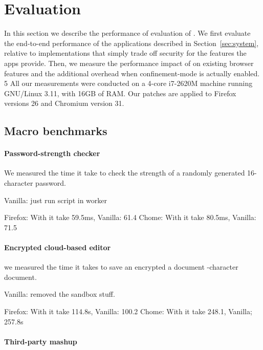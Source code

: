 \section{Evaluation}
\label{sec:eval}

In this section we describe the performance of evaluation of \sys{}.
%
We first evaluate the end-to-end performance of the \sys{}
applications described in Section~\ref{sec:system}, relative to
implementations that simply trade off security for the features the
apps provide.
%
Then, we measure the performance impact of \sys{} on existing browser
features and the additional overhead when confinement-mode is actually
enabled.
5 
All our measurements were conducted on a 4-core i7-2620M machine
running GNU/Linux 3.11, with 16GB of RAM.
%
Our patches are applied to Firefox versions 26 and Chromium version
31.
%


\subsection{Macro benchmarks}
\label{sec:eval:macro}

\paragraph{Password-strength checker}
%
We measured the time it take to check the strength of a randomly generated
16-character password.
%

Vanilla: just run script in worker

Firefox: With \sys{} it take 59.5ms, Vanilla: 61.4
Chome: With \sys{} it take 80.5ms, Vanilla:  71.5


\paragraph{Encrypted cloud-based editor}
%
we measured the time it takes to save an encrypted a document
-character document.

Vanilla: removed the sandbox stuff.

Firefox: With \sys{} it take 114.8s, Vanilla: 100.2
Chome: With \sys{} it take 248.1, Vanilla; 257.8s

\paragraph{Third-party mashup}

